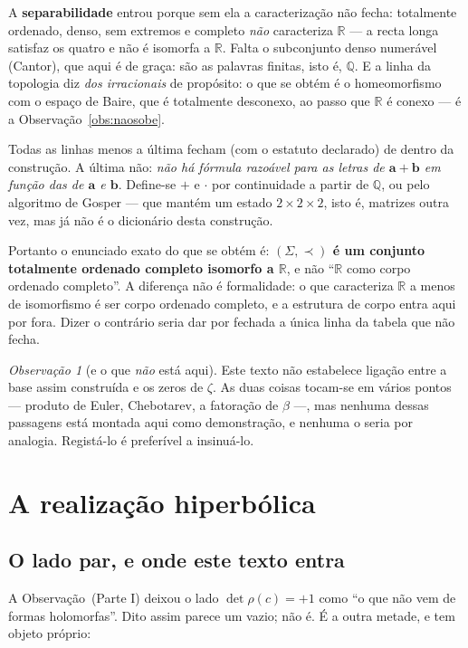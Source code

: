 \documentclass[11pt,a4paper]{article}
\theoremstyle{plain}
\theoremstyle{definition}
\theoremstyle{remark}
\newtheorem{obs}[teorema]{Observação}
\newcommand{\R}{\mathbb{R}}
\newcommand{\Q}{\mathbb{Q}}
\newcommand{\Sig}{\Sigma}
\begin{document}
A \textbf{separabilidade} entrou porque sem ela a caracterização não fecha: totalmente ordenado,
denso, sem extremos e completo \emph{não} caracteriza $\R$ --- a recta longa satisfaz os quatro e
não é isomorfa a $\R$. Falta o subconjunto denso numerável (Cantor), que aqui é de graça: são as
palavras finitas, isto é, $\Q$. E a linha da topologia diz \emph{dos irracionais} de propósito: o
que se obtém é o homeomorfismo com o espaço de Baire, que é totalmente desconexo, ao passo que
$\R$ é conexo --- é a Observação~\ref{obs:naosobe}.

Todas as linhas menos a última fecham (com o estatuto declarado) de dentro da construção. A última
não: \emph{não há fórmula razoável para as letras de $\mathbf a + \mathbf b$ em função das de
$\mathbf a$ e $\mathbf b$}. Define-se $+$ e $\cdot$ por continuidade a partir de $\Q$, ou pelo
algoritmo de Gosper --- que mantém um estado $2\times2\times2$, isto é, matrizes outra vez, mas já
não é o dicionário desta construção.

Portanto o enunciado exato do que se obtém é: \textbf{$(\Sig,\prec)$ é um conjunto totalmente
ordenado completo isomorfo a $\R$}, e não ``$\R$ como corpo ordenado completo''. A diferença não é
formalidade: o que caracteriza $\R$ a menos de isomorfismo é ser corpo ordenado completo, e a
estrutura de corpo entra aqui por fora. Dizer o contrário seria dar por fechada a única linha da
tabela que não fecha.

\begin{obs}[e o que \emph{não} está aqui]
Este texto não estabelece ligação entre a base assim construída e os zeros de $\zeta$. As duas
coisas tocam-se em vários pontos --- produto de Euler, Chebotarev, a fatoração de $\beta$ ---, mas
nenhuma dessas passagens está montada aqui como demonstração, e nenhuma o seria por analogia.
Registá-lo é preferível a insinuá-lo.
\end{obs}


\section{A realização hiperbólica}

\subsection{O lado par, e onde este texto entra}\label{sec:par}

A Observação~(Parte I) deixou o lado $\det\rho(c)=+1$ como ``o que não vem de formas
holomorfas''. Dito assim parece um vazio; não é. É a outra metade, e tem objeto próprio:
\end{document}

